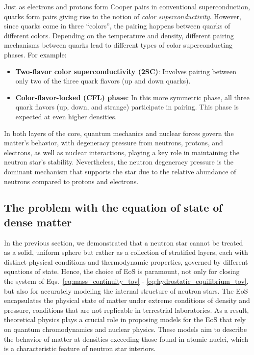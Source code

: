 \documentclass[main.tex]{subfiles}
\begin{document}
    Just as electrons and protons form Cooper pairs in conventional superconduction, quarks form pairs giving rise to the notion of \textit{color superconductivity}. However, since quarks come in three ``colors'', the pairing happens between quarks of different colors. Depending on the temperature and density, different pairing mechanisms between quarks lead to different types of color superconducting phases. For example:
    \begin{itemize}
        \item \textbf{Two-flavor color superconductivity (2SC)}: Involves pairing between only two of the three quark flavors (up and down quarks).
        \item \textbf{Color-flavor-locked (CFL) phase}: In this more symmetric phase, all three quark flavors (up, down, and strange) participate in pairing. This phase is expected at even higher densities.
    \end{itemize}

    In both layers of the core, quantum mechanics and nuclear forces govern the matter's behavior, with degeneracy pressure from neutrons, protons, and electrons, as well as nuclear interactions, playing a key role in maintaining the neutron star’s stability. Nevertheless, the neutron degeneracy pressure is the dominant mechanism that supports the star due to the relative abundance of neutrons compared to protons and electrons.

    \subsection{The problem with the equation of state of dense matter}
    In the previous section, we demonstrated that a neutron star cannot be treated as a solid, uniform sphere but rather as a collection of stratified layers, each with distinct physical conditions and thermodynamic properties, governed by different equations of state. Hence, the choice of EoS is paramount, not only for closing the system of Eqs.~\eqref{eq:mass_continuity_tov} - \eqref{eq:hydrostatic_equilibrium_tov}, but also for accurately modeling the internal structure of neutron stars. The EoS encapsulates the physical state of matter under extreme conditions of density and pressure, conditions that are not replicable in terrestrial laboratories. As a result, theoretical physics plays a crucial role in proposing models for the EoS that rely on quantum chromodynamics and nuclear physics. These models aim to describe the behavior of matter at densities exceeding those found in atomic nuclei, which is a characteristic feature of neutron star interiors.
    
\end{document}
